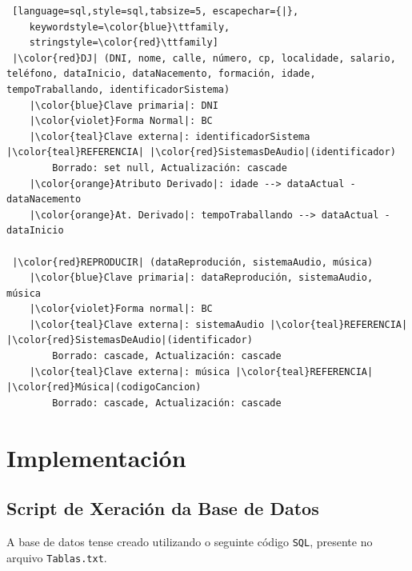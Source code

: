 \documentclass[12pt,a4paper]{book}
\theoremstyle{definition}
\theoremstyle{break}
\begin{document}
\begin{lstlisting} [language=sql,style=sql,tabsize=5, escapechar={|},
	keywordstyle=\color{blue}\ttfamily,
	stringstyle=\color{red}\ttfamily]
 |\color{red}DJ| (DNI, nome, calle, número, cp, localidade, salario, teléfono, dataInicio, dataNacemento, formación, idade, tempoTraballando, identificadorSistema)
 	|\color{blue}Clave primaria|: DNI
 	|\color{violet}Forma Normal|: BC
 	|\color{teal}Clave externa|: identificadorSistema |\color{teal}REFERENCIA| |\color{red}SistemasDeAudio|(identificador)
 		Borrado: set null, Actualización: cascade
 	|\color{orange}Atributo Derivado|: idade --> dataActual - dataNacemento
 	|\color{orange}At. Derivado|: tempoTraballando --> dataActual - dataInicio
 
 |\color{red}REPRODUCIR| (dataReprodución, sistemaAudio, música)
 	|\color{blue}Clave primaria|: dataReprodución, sistemaAudio, música
 	|\color{violet}Forma normal|: BC
 	|\color{teal}Clave externa|: sistemaAudio |\color{teal}REFERENCIA| |\color{red}SistemasDeAudio|(identificador)
 		Borrado: cascade, Actualización: cascade
 	|\color{teal}Clave externa|: música |\color{teal}REFERENCIA| |\color{red}Música|(codigoCancion)
 		Borrado: cascade, Actualización: cascade
\end{lstlisting}


\chapter{Implementación}
\section{Script de Xeración da Base de Datos}

A base de datos tense creado utilizando o seguinte código \texttt{SQL}, presente no arquivo \texttt{Tablas.txt}.
\end{document}

